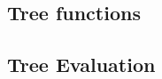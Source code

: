 \documentclass[hw3.tex]{subfiles}
\begin{document}
\subsection{Tree functions}

\subsection{Tree Evaluation}

\end{document}
